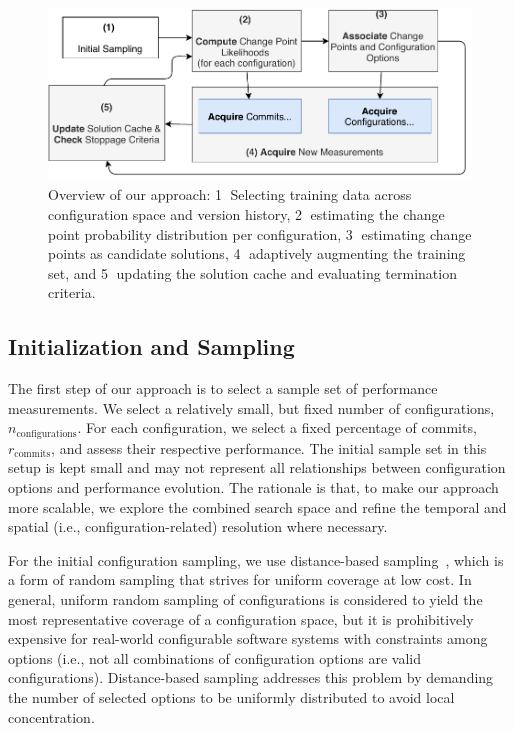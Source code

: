 \documentclass[sigconf, screen]{acmart}
\begin{document}
	\begin{figure}[ht]
		\includegraphics[width=\linewidth]{images/ablauf.pdf}
		\caption{Overview of our approach:  \textcircled{1} Selecting training data across configuration space and version history, \textcircled{2} estimating the change point probability distribution per configuration, \textcircled{3} estimating change points as candidate solutions, \textcircled{4} adaptively augmenting the training set, and \textcircled{5} updating the solution cache and evaluating termination criteria.}
		\label{fig:overview}
	\end{figure}
	
	\subsection{Initialization and Sampling}\label{sec:initialization}
	The first step of our approach is to select a sample set of performance measurements. 
	We select a relatively small, but fixed number of configurations, $n_\text{configurations}$. For each configuration, we select a fixed percentage of commits, $r_\text{commits}$, and assess their respective performance.
	The initial sample set in this setup is kept small and may not represent all relationships between configuration options and performance evolution. 
	The rationale is that, to make our approach more scalable, we explore the combined search space and refine the temporal and  spatial (i.e., configuration-related) resolution where necessary. 
	
	For the initial configuration sampling, we use distance-based  sampling~\cite{kaltenecker_distance-based_2019}, which is a form of random sampling that strives for uniform coverage at low cost. 
	In general, uniform random sampling of configurations is considered to yield the most representative coverage of a configuration space, but it is prohibitively expensive for real-world configurable software systems with constraints among options (i.e., not all combinations of configuration options are valid configurations). 
	Distance-based sampling addresses this problem by demanding the number of selected options to be uniformly distributed to avoid local concentration. 
	
\end{document}
